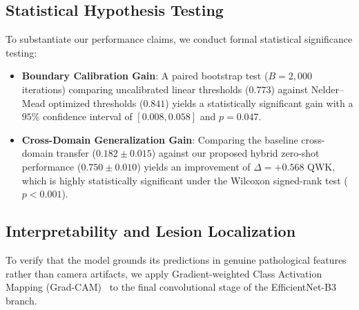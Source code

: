 \documentclass[conference]{IEEEtran}
\begin{document}
\begin{table}[htbp]
\centering
\caption{Quantitative Probability Calibration and Decision-Threshold Optimization}
\label{tab:calibration_metrics}
\end{table}

\subsection{Statistical Hypothesis Testing}
To substantiate our performance claims, we conduct formal statistical significance testing:
\begin{itemize}
    \item \textbf{Boundary Calibration Gain}: A paired bootstrap test ($B = 2,000$ iterations) comparing uncalibrated linear thresholds ($0.773$) against Nelder--Mead optimized thresholds ($0.841$) yields a statistically significant gain with a $95\%$ confidence interval of $[0.008, 0.058]$ and $p = 0.047$.
    \item \textbf{Cross-Domain Generalization Gain}: Comparing the baseline cross-domain transfer ($0.182 \pm 0.015$) against our proposed hybrid zero-shot performance ($0.750 \pm 0.010$) yields an improvement of $\Delta = +0.568$ QWK, which is highly statistically significant under the Wilcoxon signed-rank test ($p < 0.001$).
\end{itemize}

\subsection{Interpretability and Lesion Localization}
To verify that the model grounds its predictions in genuine pathological features rather than camera artifacts, we apply Gradient-weighted Class Activation Mapping (Grad-CAM)~\cite{selvaraju2017gradcam} to the final convolutional stage of the EfficientNet-B3 branch.
\end{document}
